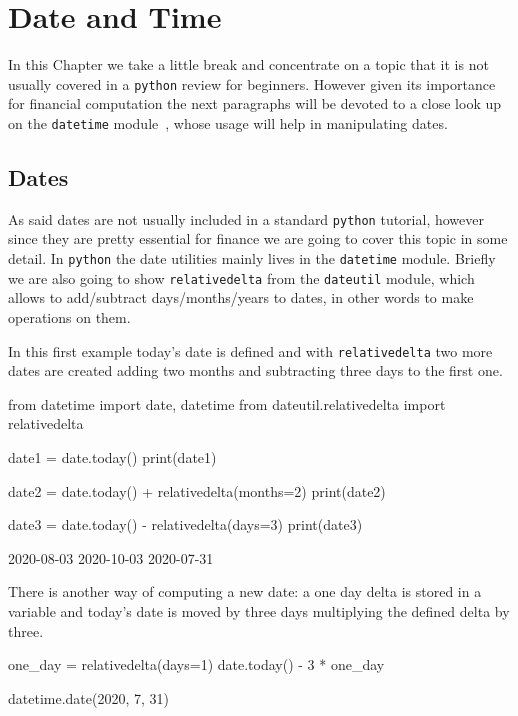 \chapter{Date and Time}
\label{sec:datetime}

In this Chapter we take a little break and concentrate on a topic that it is not usually covered in a \texttt{python} review for beginners. However given its importance for financial computation the next paragraphs will be devoted to a close look up on the \texttt{datetime} module~\cite{bib:datetime}, whose usage will help in manipulating dates.

\section{Dates}\label{dates}

As said dates are not usually included in a standard \texttt{python} tutorial, however since they 
are pretty essential for finance we are going to cover this topic in some detail. 
In \texttt{python} the date utilities mainly lives in the \texttt{datetime} module. Briefly we are 
also going to show \texttt{relativedelta} from the \texttt{dateutil} module, which allows to 
add/subtract days/months/years to dates, in other words to make operations on them.

In this first example today's date is defined and with \texttt{relativedelta} two more dates are created 
adding two months and subtracting three days to the first one.

\begin{ipython}
from datetime import date, datetime
from dateutil.relativedelta import relativedelta

date1 = date.today()
print(date1)

date2 = date.today() + relativedelta(months=2)
print(date2)

date3 = date.today() - relativedelta(days=3)
print(date3)
\end{ipython}
\begin{ioutput}
2020-08-03
2020-10-03
2020-07-31
\end{ioutput}

There is another way of computing a new date: a one day delta is stored in a variable 
and today's date is moved by three days multiplying the defined delta by three.

\begin{ipython}
one_day = relativedelta(days=1)
date.today() - 3 * one_day
\end{ipython}
\begin{ioutput}
datetime.date(2020, 7, 31)
\end{ioutput}

